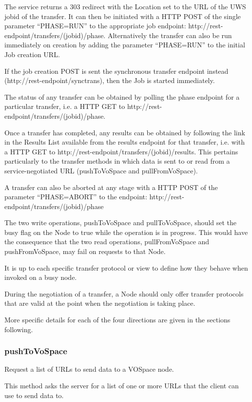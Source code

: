 \documentclass[11pt,a4paper]{ivoa}
\begin{document}
The service returns a 303 redirect with the Location set to the URL of the UWS jobid of the transfer.  It can then be initiated with a HTTP POST of the single parameter ``PHASE=RUN'' to the appropriate job endpoint: http://rest-endpoint/transfers/(jobid)/phase. Alternatively the transfer can also be run immediately on creation by adding the parameter ``PHASE=RUN'' to the initial Job creation URL.

If the job creation POST is sent the synchronous transfer endpoint instead (http://rest-endpoint/synctrans), then the Job is started immediately.

The status of any transfer can be obtained by polling the phase endpoint for a particular transfer, i.e. a HTTP GET to http://rest-endpoint/transfers/(jobid)/phase.

Once a transfer has completed, any results can be obtained by following the link in the Results List available from the results endpoint for that transfer, i.e. with a HTTP GET to http://rest-endpoint/transfers/(jobid)/results. This pertains particularly to the transfer methods in which data is sent to or read from a service-negotiated URL (pushToVoSpace and pullFromVoSpace).

A transfer can also be aborted at any stage with a HTTP POST of the parameter ``PHASE=ABORT'' to the endpoint: http://rest-endpoint/transfers/(jobid)/phase

The two write operations, pushToVoSpace and pullToVoSpace, should set the busy flag on the Node to true while the operation is in progress.  This would have the consequence that the two read operations, pullFromVoSpace and pushFromVoSpace, may fail on requests to that Node.

It is up to each specific transfer protocol or view to define how they behave when invoked on a busy node.

During the negotiation of a transfer, a Node should only offer transfer protocols that are valid at the point when the negotiation is taking place.

More specific details for each of the four directions are given in the sections following.

\subsubsection{pushToVoSpace}
\label{subsubsec:pushtovospace}
Request a list of URLs to send data to a VOSpace node.

This method asks the server for a list of one or more URLs that the client can use to send data to.
\end{document}
